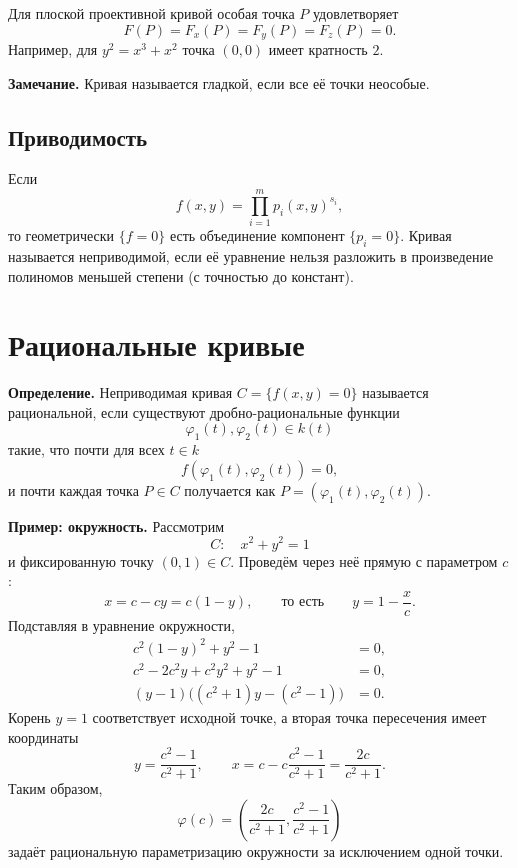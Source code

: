 \documentclass[12pt,a4paper]{article}
\begin{document}
Для плоской проективной кривой особая точка $P$ удовлетворяет
\[
F(P)=F_x(P)=F_y(P)=F_z(P)=0.
\]
Например, для $y^2=x^3+x^2$ точка $(0,0)$ имеет кратность $2$.

\textbf{Замечание.} Кривая называется гладкой, если все её точки неособые.

\subsection*{Приводимость}
Если
\[
f(x,y)=\prod_{i=1}^m p_i(x,y)^{s_i},
\]
то геометрически $\{f=0\}$ есть объединение компонент $\{p_i=0\}$. Кривая называется неприводимой, если её уравнение нельзя разложить в произведение полиномов меньшей степени (с точностью до констант).

\section{Рациональные кривые}
\textbf{Определение.} Неприводимая кривая $C=\{f(x,y)=0\}$ называется рациональной, если существуют дробно-рациональные функции
\[
\varphi_1(t),\varphi_2(t)\in k(t)
\]
такие, что почти для всех $t\in k$
\[
f(\varphi_1(t),\varphi_2(t))=0,
\]
и почти каждая точка $P\in C$ получается как $P=(\varphi_1(t),\varphi_2(t))$.

\textbf{Пример: окружность.} Рассмотрим
\[
C:\quad x^2+y^2=1
\]
и фиксированную точку $(0,1)\in C$. Проведём через неё прямую с параметром $c$:
\[
x=c-cy=c(1-y),\qquad\text{то есть}\qquad y=1-\frac{x}{c}.
\]
Подставляя в уравнение окружности,
\begin{align*}
c^2(1-y)^2+y^2-1&=0,\\
c^2-2c^2y+c^2y^2+y^2-1&=0,\\
(y-1)\bigl((c^2+1)y-(c^2-1)\bigr)&=0.
\end{align*}
Корень $y=1$ соответствует исходной точке, а вторая точка пересечения имеет координаты
\[
y=\frac{c^2-1}{c^2+1},\qquad
x=c-c\frac{c^2-1}{c^2+1}=\frac{2c}{c^2+1}.
\]
Таким образом,
\[
\varphi(c)=\left(\frac{2c}{c^2+1},\frac{c^2-1}{c^2+1}\right)
\]
задаёт рациональную параметризацию окружности за исключением одной точки.

\begin{center}
\end{center}
\end{document}
